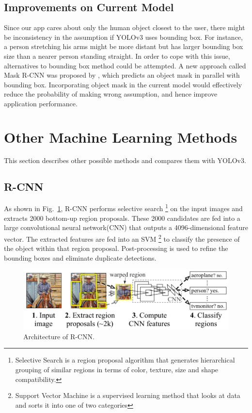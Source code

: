 \documentclass[letterpaper]{article} %
\begin{document}
\subsection{Improvements on Current Model}
Since our app cares about only the human object closest to the user, there might be inconsistency in the assumption if YOLOv3 uses bounding box. For instance, a person stretching his arms might be more distant but has larger bounding box size than a nearer person standing straight. In order to cope with this issue, alternatives to bounding box method could be attempted. A new approach called Mask R-CNN was proposed by \cite{Mask-RCNN}, which predicts an object mask in parallel with bounding box. Incorporating object mask in the current model would effectively reduce the probability of making wrong assumption, and hence improve application performance.

\section{Other Machine Learning Methods}
This section describes other possible methods and compares them with YOLOv3.

\subsection{R-CNN}
As shown in Fig.~\ref{fig:r_cnn}, R-CNN performs selective search \footnote{Selective Search is a region proposal algorithm that generates hierarchical grouping of similar regions in terms of color, texture, size and shape compatibility.} on the input images and extracts 2000 bottom-up region proposals. These 2000 candidates are fed into a large convolutional neural network(CNN) that outputs a 4096-dimensional feature vector. The extracted features are fed into an SVM \footnote{Support Vector Machine is a supervised learning method that looks at data and sorts it into one of two categories} to classify the presence of the object within that region proposal. Post-processing is used to refine the bounding boxes and eliminate duplicate detections.\\
\begin{figure}[ht]
\hspace{0mm}
\centering
\includegraphics[scale = 0.23]{Figure/r_cnn.png}
\caption{\footnotesize{Architecture of R-CNN.}}
\label{fig:r_cnn}
\vspace{0mm}
\end{figure}
\end{document}
